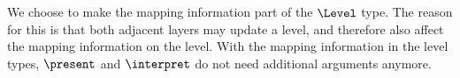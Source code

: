 

We choose to make the mapping information part of the $\Level$ type. The reason for this is that both adjacent layers may update a level, and therefore also affect the mapping information on the level.  With the mapping information in the level types, $\present$ and $\interpret$ do not need additional arguments anymore.
\ec


